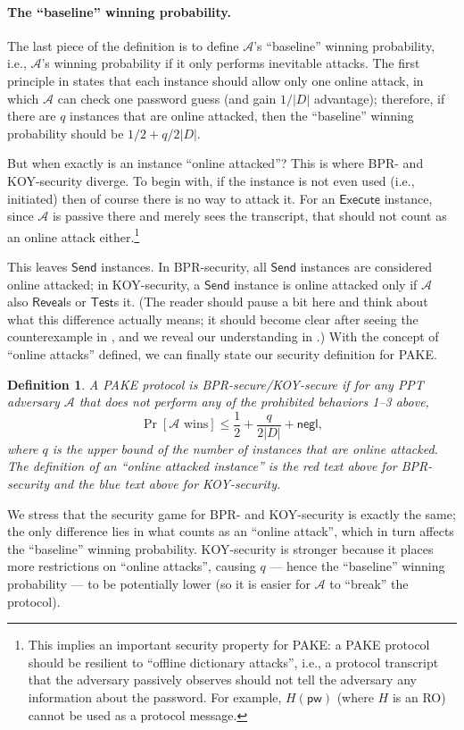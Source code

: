 \documentclass{article}
\newtheorem{definition}{Definition}
\newcommand{\negl}{\mathsf{negl}}
\newcommand{\adv}{\mathcal{A}}
\newcommand{\pw}{\mathsf{pw}}
\newcommand{\Execute}{\mathsf{Execute}}
\newcommand{\Send}{\mathsf{Send}}
\newcommand{\Reveal}{\mathsf{Reveal}}
\newcommand{\Test}{\mathsf{Test}}
\begin{document}
\paragraph{The ``baseline'' winning probability.}
The last piece of the definition is to define $\adv$'s ``baseline'' winning probability, i.e., $\adv$'s winning probability if it only performs inevitable attacks. The first principle in  states that each instance should allow only one online attack, in which $\adv$ can check one password guess (and gain $1/|D|$ advantage); therefore, if there are $q$ instances that are online attacked, then the ``baseline'' winning probability should be $1/2 + q/2|D|$.

But when exactly is an instance ``online attacked''? This is where BPR- and KOY-security diverge. To begin with, if the instance is not even used (i.e., initiated) then of course there is no way to attack it. For an $\Execute$ instance, since $\adv$ is passive there and merely sees the transcript, that should not count as an online attack either.\footnote{This implies an important security property for PAKE: a PAKE protocol should be resilient to ``offline dictionary attacks'', i.e., a protocol transcript that the adversary passively observes should not tell the adversary any information about the password. For example, $H(\pw)$ (where $H$ is an RO) cannot be used as a protocol message.}

This leaves $\Send$ instances. {\color{red}In BPR-security, all $\Send$ instances are considered online attacked}; {\color{blue}in KOY-security, a $\Send$ instance is online attacked only if $\adv$ also $\Reveal$s or $\Test$s it}. (The reader should pause a bit here and think about what this difference actually means; it should become clear after seeing the counterexample in , and we reveal our understanding in .) With the concept of ``online attacks'' defined, we can finally state our security definition for PAKE.
\begin{definition}
A PAKE protocol is \emph{\textsf{BPR-secure/KOY-secure}} if for any PPT adversary $\adv$ that does not perform any of the prohibited behaviors 1--3 above,
\[
\Pr[\adv\text{ wins}] \leq \frac{1}{2} + \frac{q}{2|D|} + \negl,
\]
where $q$ is the upper bound of the number of instances that are online attacked. The definition of an ``online attacked instance'' is the red text above for BPR-security and the blue text above for KOY-security.
\end{definition}
We stress that the security game for BPR- and KOY-security is exactly the same; the only difference lies in what counts as an ``online attack'', which in turn affects the ``baseline'' winning probability. KOY-security is stronger because it places more restrictions on ``online attacks'', causing $q$ --- hence the ``baseline'' winning probability --- to be potentially lower (so it is easier for $\adv$ to ``break'' the protocol).
\end{document}
